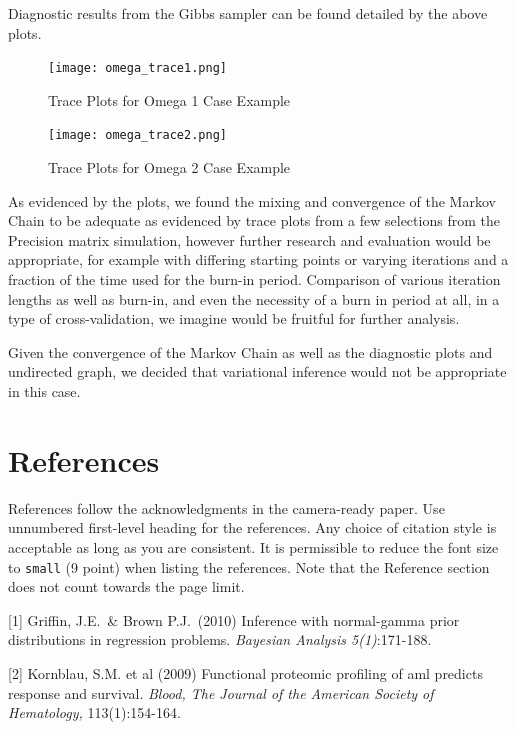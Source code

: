 \documentclass{article}
\begin{document}
Diagnostic results from the Gibbs sampler can be found detailed by the above plots. 
\pagebreak
\bigskip
\begin{figure}
    \centering
    \texttt{[image: omega\_trace1.png]}
    \caption{Trace Plots for Omega 1 Case Example}
    \label{fig:enter-label}
\end{figure}

\pagebreak
\begin{figure}
    \centering
    \texttt{[image: omega\_trace2.png]}
    \caption{Trace Plots for Omega 2 Case Example}
    \label{fig:enter-label}
\end{figure}

As evidenced by the plots, we found the mixing and convergence of the Markov Chain to be adequate as evidenced by trace plots from a few selections from the Precision matrix simulation, however further research and evaluation would be appropriate, for example with differing starting points or varying iterations and a fraction of the time used for the burn-in period. Comparison of various iteration lengths as well as burn-in, and even the necessity of a burn in period at all, in a type of cross-validation, we imagine would be fruitful for further analysis. 

Given the convergence of the Markov Chain as well as the diagnostic plots and undirected graph, we decided that variational inference would not be appropriate in this case. 

\section*{References}


References follow the acknowledgments in the camera-ready paper. Use unnumbered first-level heading for
the references. Any choice of citation style is acceptable as long as you are
consistent. It is permissible to reduce the font size to \verb+small+ (9 point)
when listing the references.
Note that the Reference section does not count towards the page limit.
\medskip


\small

[1] Griffin, J.E.\ \& Brown P.J.\ (2010) Inference with normal-gamma prior distributions in regression problems. {\it Bayesian Analysis 5(1)}:171-188.

[2] Kornblau, S.M. et al (2009) Functional proteomic profiling of aml predicts response and survival. {\it Blood, The Journal of the American Society of Hematology,} 113(1):154-164.
\end{document}
